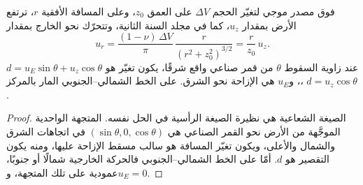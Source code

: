 \begin{proposition}\label{prop:b3:remote-sensing-gis:mogi-los}
فوق مصدر موجي لتغيّر الحجم $\Delta V$ على العمق $z_0$، وعلى المسافة
الأفقية $r$، ترتفع الأرض بمقدار $u_z$، كما في مجلد السنة الثانية،
وتتحرّك نحو الخارج بمقدار
\[
u_r = \frac{(1 - \nu)\,\Delta V}{\pi}\,\frac{r}{(r^2 + z_0^2)^{3/2}} = \frac{r}{z_0}\,u_z .
\]
عند زاوية السقوط $\theta$ من قمر صناعي واقع شرقًا، يكون تغيّر 
هو $d = u_E\sin\theta + u_z\cos\theta$، و$u_E$ هي الإزاحة نحو الشرق.
على الخط الشمالي--الجنوبي المار بالمركز،
$d = u_z\cos\theta$.
\end{proposition}

\begin{proof}
الصيغة الشعاعية هي نظيرة الصيغة الرأسية في الحل
نفسه. المتجهة الواحدية الموجَّهة من الأرض نحو القمر الصناعي هي
$(\sin\theta, 0, \cos\theta)$ في اتجاهات الشرق والشمال والأعلى، ويكون تغيّر المسافة
هو سالب مسقط الإزاحة عليها، ومنه يكون التقصير
هو $d$. أمّا على الخط الشمالي--الجنوبي فالحركة الخارجية
شمالًا أو جنوبًا، عمودية على تلك المتجهة، و$u_E = 0$.
\end{proof}

